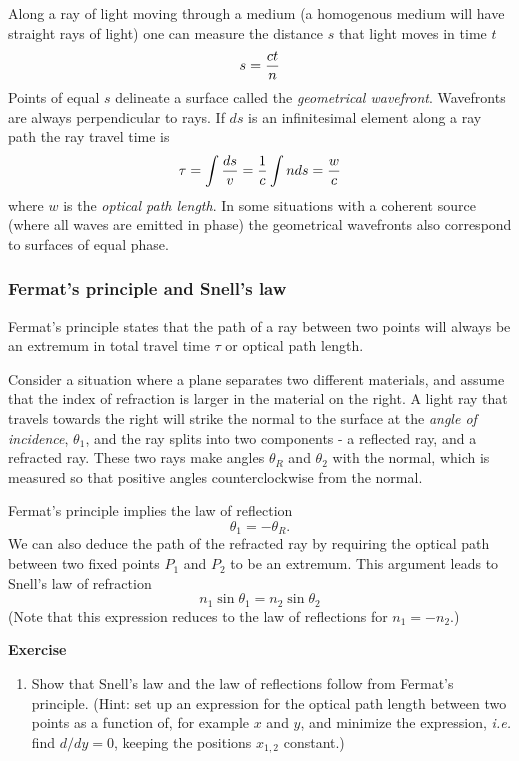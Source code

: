 \documentclass{article}
\newcommand{\be}{\begin{equation}}
\newcommand{\ee}{\end{equation}}
\begin{document}
Along a ray of light moving through a medium (a homogenous medium will have straight rays
of light) one can measure the distance $s$ that light moves in time $t$
\[
s={ct\over n}
\]
Points of equal $s$ delineate a surface called the {\it geometrical wavefront}. Wavefronts
are always perpendicular to rays. If $ds$ is an infinitesimal element along a ray path the
ray travel time is 
\[
\tau=\int{ds\over v}={1\over c}\int nds={w\over c}
\]
where $w$ is the {\it optical path length}. In some situations with a coherent source (where
all waves are emitted in phase) the geometrical wavefronts also correspond to surfaces of
equal phase.

\subsubsection{Fermat's principle and Snell's law}

Fermat's principle states that the path of a ray between two points will always be an extremum
in total travel time $\tau$ or optical path length.

 Consider a situation where a plane separates
two different materials, and assume that the index of refraction is larger in the material on the
right. A light ray that travels towards the right will strike the normal to the surface at the 
{\it angle of incidence}, $\theta_1$, and the ray splits into two components - a reflected ray, 
and a refracted ray. These two rays make angles $\theta_R$ and $\theta_2$ with the normal, 
which is measured so that positive angles counterclockwise from the normal. 

Fermat's principle implies the law of reflection
\[
\theta_1=-\theta_R.
\]
We can also deduce the path of the refracted ray by requiring the optical path between two
fixed points $P_1$ and $P_2$ to be an extremum. This argument leads to Snell's law of 
refraction
\be
n_1\sin\theta_1=n_2\sin\theta_2
\label{eq:snell}
\ee
(Note that this expression reduces to the law of reflections for
$n_1=-n_2$.) 

{\bf Exercise}

\begin{enumerate}
\item Show that Snell's law and the law of reflections follow from
  Fermat's principle. (Hint: set up an expression for the optical path length
  between two points as a function of, for example $x$ and $y$, and
  minimize the expression, {\it i.e.} find ${d/dy}=0$, keeping the
  positions $x_{1,2}$ constant.)
\setcounter{count}{\value{enumi}} 
\end{enumerate}
\end{document}
